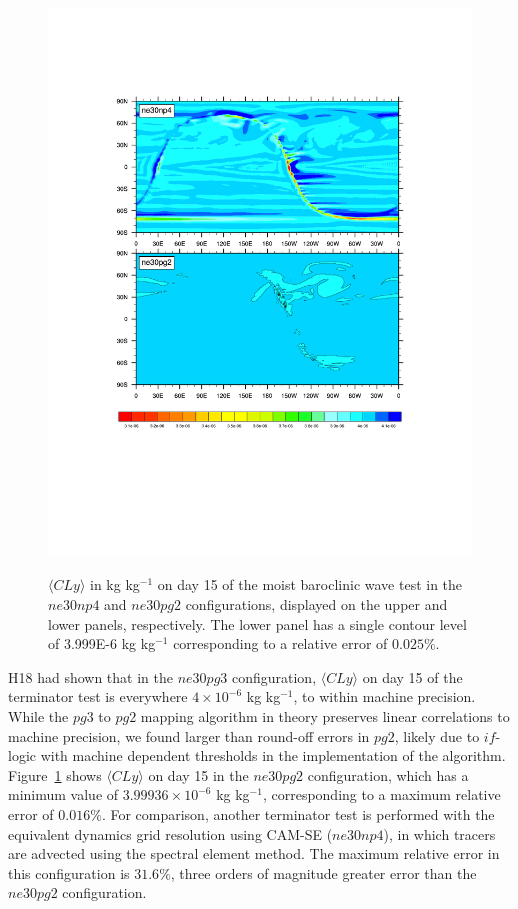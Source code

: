 \documentclass{agujournal}
\begin{document}
\begin{figure}[t]
\begin{center}
\noindent\includegraphics[width=30pc,angle=0]{figs/temp_terminator.pdf}\\
\end{center}
\caption{$\langle CLy \rangle$ in kg kg$^{-1}$ on day 15 of the moist baroclinic wave test in the $ne30np4$ and $ne30pg2$ configurations, displayed on the upper and lower panels, respectively. The lower panel has a single contour level of 3.999E-6 kg kg$^{-1}$ corresponding to a relative error of $0.025\%$.}
\label{fig:terminator}
\end{figure}

H18 had shown that in the $ne30pg3$ configuration, $\langle CLy \rangle$ on day 15 of the terminator test is everywhere $4\times10^{-6}$ kg kg$^{-1}$, to within machine precision. While the $pg3$ to $pg2$ mapping algorithm in theory preserves linear correlations to machine precision, we found larger than round-off errors in $pg2$, likely due to $if$-logic with machine dependent thresholds in the implementation of the algorithm. Figure~\ref{fig:terminator} shows $\langle CLy \rangle$ on day 15 in the $ne30pg2$ configuration, which has a minimum value of $3.99936\times10^{-6}$ kg kg$^{-1}$, corresponding to a maximum relative error of $0.016\%$. For comparison, another terminator test is performed with the equivalent dynamics grid resolution using CAM-SE ($ne30np4$), in which tracers are advected using the spectral element method. The maximum relative error in this configuration is $31.6\%$, three orders of magnitude greater error than the $ne30pg2$ configuration.
\end{document}
